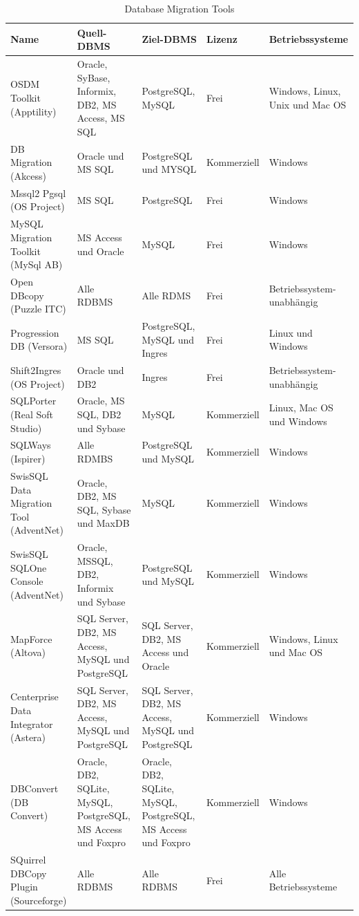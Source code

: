\begin{table}[h]
\begin{center}
	\begin{tabular}{ |p{3cm}|p{3cm}|p{3cm}|p{2cm}|p{3cm}| }
		\hline
		\textbf{Name} & \textbf{Quell-DBMS} &  \textbf{Ziel-DBMS} &\textbf{Lizenz} & \textbf{Betriebssysteme} \\
		\hline
		 OSDM Toolkit (Apptility) & 
		  Oracle, SyBase, Informix, DB2, MS Access, MS SQL &  PostgreSQL, MySQL & 
		 Frei &  Windows, Linux, Unix und Mac OS \\
		 \hline
		 DB Migration (Akcess) &  Oracle und MS SQL &  PostgreSQL und MYSQL  & Kommerziell & Windows\\
		 \hline
		 Mssql2 Pgsql (OS Project) &   MS SQL&   PostgreSQL  & Frei & Windows \\
		 \hline
		 MySQL
		 Migration
		 Toolkit (MySql AB)&  MS Access und Oracle &  MySQL & Frei & Windows  \\
		\hline
		Open DBcopy (Puzzle ITC) & Alle RDBMS& Alle RDMS & Frei & Betriebssystem- unabhängig \\
		\hline
		Progression DB (Versora) &  MS SQL &  PostgreSQL, MySQL und	Ingres & Frei & Linux und Windows \\
		\hline
		Shift2Ingres (OS Project)& Oracle und DB2 & Ingres & Frei &  Betriebssystem- unabhängig \\
		\hline
		SQLPorter (Real Soft Studio)& Oracle, MS SQL, DB2 und Sybase & MySQL & Kommerziell & Linux, Mac OS und Windows \\
		\hline
		SQLWays (Ispirer) & Alle RDMBS & PostgreSQL und MySQL & Kommerziell & Windows \\
		\hline
		SwisSQL Data Migration Tool (AdventNet)& Oracle, DB2, MS SQL, Sybase und MaxDB & MySQL & Kommerziell & Windows \\
		\hline
		SwisSQL SQLOne Console (AdventNet)& Oracle, MSSQL, DB2, Informix und Sybase & PostgreSQL und MySQL  & Kommerziell & Windows \\
		\hline
		MapForce (Altova) & SQL Server, DB2, MS Access, MySQL und PostgreSQL & SQL Server, DB2, MS Access und Oracle & Kommerziell & Windows, Linux und Mac OS \\
		\hline
		Centerprise Data Integrator (Astera) & SQL Server, DB2, MS Access, MySQL und PostgreSQL& SQL Server, DB2, MS Access, MySQL und PostgreSQL& 
		Kommerziell & Windows\\
		\hline
		DBConvert (DB Convert) & Oracle, DB2, SQLite, MySQL, PostgreSQL, MS Access und Foxpro & Oracle, DB2, SQLite, MySQL, PostgreSQL, MS Access und Foxpro & Kommerziell & Windows \\
		\hline
		SQuirrel DBCopy Plugin (Sourceforge) & Alle RDBMS  & Alle RDBMS & Frei & Alle Betriebssysteme\\
		\hline
	\end{tabular}
\end{center}
\caption{Database Migration Tools}
\label{table:tools}
\end{table}


